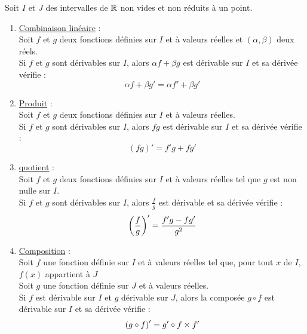 \begin{defprop}
	Soit \(I\) et \(J\) des intervalles de \(\mathbb{R}\) non vides et non réduits à un point. \\
	\begin{enumerate}
		\item \underline{Combinaison linéaire} : \\
		      Soit \(f\) et \(g\) deux fonctions définies sur \(I\) et à valeurs réelles et \((\alpha, \beta)\) deux réels. \\
		      Si \(f\) et \(g\) sont dérivables sur \(I\), alors \(\alpha f + \beta g\) est dérivable sur \(I\) et sa dérivée vérifie :
		      \[\alpha f + \beta g' = \alpha f' + \beta g'\]
		\item \underline{Produit} : \\
		      Soit \(f\) et \(g\) deux fonctions définies sur \(I\) et à valeurs réelles. \\
		      Si \(f\) et \(g\) sont dérivables sur \(I\), alors \(f g\) est dérivable sur \(I\) et sa dérivée vérifie :
		      \[(f g)' =f'g+fg'\]
		      \item\underline{quotient} :\\
		      Soit \(f\) et \(g\) deux fonctions définies sur \(I\) et à valeurs réelles tel que \(g\) est non nulle sur \(I\). \\
		      Si \(f\) et \(g\) sont dérivables sur \(I\), alors \(\frac{f}{g}\) est dérivable et sa dérivée vérifie :
		      \[\left(\frac{f}{g}\right)' = \frac{f'g-fg'}{g^2}\]
		\item \underline{Composition} : \\
		      Soit \(f\) une fonction définie sur \(I\) et à valeurs réelles tel que, pour tout \(x\) de \(I\), \(f(x)\) appartient à \(J\)\\
		      Soit \(g\) une fonction définie sur \(J\) et à valeurs réelles. \\
		      Si \(f\) est dérivable sur \(I\) et \(g\) dérivable sur \(J\), alors la composée \(g \circ f\) est dérivable sur \(I\) et sa dérivée vérifie :
		      \[\left(g \circ f\right)' = g' \circ f \times f'\]
	\end{enumerate}
\end{defprop}

